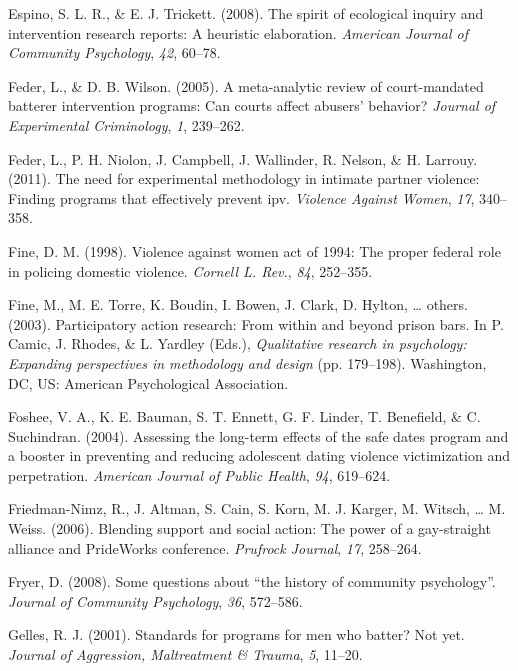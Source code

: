 \documentclass[11pt,]{tufte-book}
\begin{document}
\hypertarget{ref-espino2008spirit}{}
Espino, S. L. R., \& E. J. Trickett. (2008). The spirit of ecological
inquiry and intervention research reports: A heuristic elaboration.
\emph{American Journal of Community Psychology}, \emph{42}, 60--78.

\hypertarget{ref-feder2005meta}{}
Feder, L., \& D. B. Wilson. (2005). A meta-analytic review of
court-mandated batterer intervention programs: Can courts affect
abusers' behavior? \emph{Journal of Experimental Criminology}, \emph{1},
239--262.

\hypertarget{ref-feder2011need}{}
Feder, L., P. H. Niolon, J. Campbell, J. Wallinder, R. Nelson, \& H.
Larrouy. (2011). The need for experimental methodology in intimate
partner violence: Finding programs that effectively prevent ipv.
\emph{Violence Against Women}, \emph{17}, 340--358.

\hypertarget{ref-fine1998violence}{}
Fine, D. M. (1998). Violence against women act of 1994: The proper
federal role in policing domestic violence. \emph{Cornell L. Rev.},
\emph{84}, 252--355.

\hypertarget{ref-fine2003participatory}{}
Fine, M., M. E. Torre, K. Boudin, I. Bowen, J. Clark, D. Hylton,
\ldots{} others. (2003). Participatory action research: From within and
beyond prison bars. In P. Camic, J. Rhodes, \& L. Yardley (Eds.),
\emph{Qualitative research in psychology: Expanding perspectives in
methodology and design} (pp. 179--198). Washington, DC, US: American
Psychological Association.

\hypertarget{ref-foshee2004assessing}{}
Foshee, V. A., K. E. Bauman, S. T. Ennett, G. F. Linder, T. Benefield,
\& C. Suchindran. (2004). Assessing the long-term effects of the safe
dates program and a booster in preventing and reducing adolescent dating
violence victimization and perpetration. \emph{American Journal of
Public Health}, \emph{94}, 619--624.

\hypertarget{ref-friedman-nimz2006blending}{}
Friedman-Nimz, R., J. Altman, S. Cain, S. Korn, M. J. Karger, M. Witsch,
\ldots{} M. Weiss. (2006). Blending support and social action: The power
of a gay-straight alliance and PrideWorks conference. \emph{Prufrock
Journal}, \emph{17}, 258--264.

\hypertarget{ref-fryer2008some}{}
Fryer, D. (2008). Some questions about ``the history of community
psychology''. \emph{Journal of Community Psychology}, \emph{36},
572--586.

\hypertarget{ref-gelles2001standards}{}
Gelles, R. J. (2001). Standards for programs for men who batter? Not
yet. \emph{Journal of Aggression, Maltreatment \& Trauma}, \emph{5},
11--20.
\end{document}
